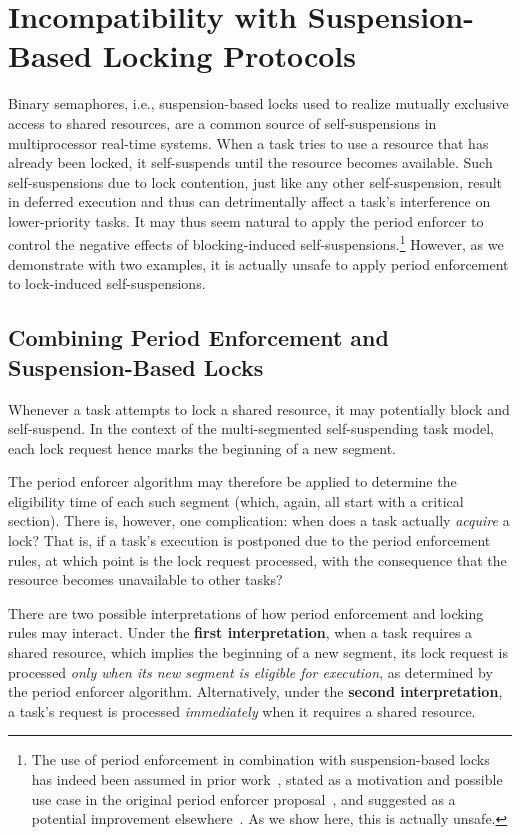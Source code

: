 \section{Incompatibility with Suspension-Based Locking Protocols}
\label{sec:locking}

Binary semaphores, i.e., suspension-based locks used to realize mutually exclusive access to shared resources, are a common source of self-suspensions in multiprocessor real-time systems. When a task tries to use a resource that has already been locked, it self-suspends until the resource becomes available. Such self-suspensions due to lock contention, just like any other self-suspension, result in deferred execution and thus can detrimentally affect a task's interference on lower-priority tasks. It may thus seem natural to apply the period enforcer  to control the negative effects of blocking-induced self-suspensions.\footnote{The use of  period enforcement in combination with suspension-based locks has indeed been assumed in prior work~\cite{Raj:91}, stated as a motivation and possible use case in the original period enforcer proposal~\cite{Raj:suspension1991}, and suggested as a potential improvement elsewhere~\cite{Lak:11,LNR:09}. As we show here, this is actually unsafe.} However, as we demonstrate with two examples, it is actually unsafe to apply period enforcement to lock-induced self-suspensions. 



\subsection{Combining Period Enforcement and Suspension-Based Locks}

Whenever a task attempts to lock a shared resource, it may potentially block and self-suspend. In the context of the multi-segmented self-suspending task model, each lock request hence marks the beginning of a new segment.

The period enforcer algorithm may therefore be applied to determine the eligibility time of each such segment (which, again, all start with a critical section). There is, however, one complication: when does a task actually \emph{acquire} a lock? That is, if a task's execution is postponed due to the period enforcement rules, at which point is the lock request processed, with the consequence that the resource becomes unavailable to other tasks? 

There are two possible interpretations of how period enforcement and locking rules may interact. Under the \textbf{first interpretation}, when a task requires a shared resource, which implies the beginning of a new segment, its lock request is processed \emph{only when its new segment is eligible for execution}, as determined by the period enforcer algorithm. Alternatively, under the \textbf{second interpretation}, a task's request is processed \emph{immediately} when it requires a shared resource.


